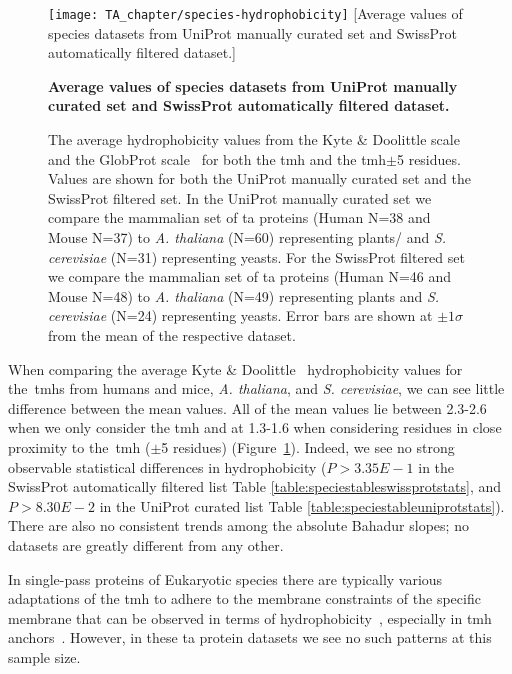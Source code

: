 \begin{figure}[!ht]
\centering
\texttt{[image: TA\_chapter/species-hydrophobicity]}
[Average values of species datasets from UniProt manually curated set and SwissProt automatically filtered dataset.]
{\textbf{Average values of species datasets from UniProt manually curated set and SwissProt automatically filtered dataset.}

The average hydrophobicity values from the Kyte \& Doolittle scale~\cite{Kyte1982} and the GlobProt scale~\cite{Linding2003} for both the \gls{tmh} and the \gls{tmh}$\pm$5 residues. Values are shown for both the UniProt manually curated set and the SwissProt filtered set. In the UniProt manually curated set we compare the mammalian set of \gls{ta} proteins (Human N=38 and Mouse N=37) to \textit{A. thaliana} (N=60) representing plants/ and \textit{S. cerevisiae} (N=31) representing yeasts. For the SwissProt filtered set we compare the mammalian set of \gls{ta} proteins (Human N=46 and Mouse N=48) to \textit{A. thaliana} (N=49) representing plants  and  \textit{S. cerevisiae} (N=24) representing yeasts.
Error bars are shown at $\pm 1 \sigma$ from the mean of the respective dataset.
}

\label{fig:average_species_hydrophobicity_ta}
\end{figure}

When comparing the average Kyte \& Doolittle~\cite{Kyte1982} hydrophobicity values for the~\gls{tmh}s from humans and mice, \textit{A. thaliana}, and  \textit{S. cerevisiae}, we can see little difference between the mean values.
All of the mean values lie between 2.3-2.6 when we only consider the \gls{tmh} and at 1.3-1.6 when considering residues in close proximity to the~\gls{tmh} ($\pm$5 residues) (Figure~\ref{fig:average_species_hydrophobicity_ta}).
Indeed, we see no strong observable statistical differences in hydrophobicity ($P>3.35E-1$ in the SwissProt automatically filtered list Table \ref{table:speciestableswissprotstats}, and $P>8.30E-2$ in the UniProt curated list Table \ref{table:speciestableuniprotstats}).
There are also no consistent trends among the absolute Bahadur slopes; no datasets are greatly different from any other.

In single-pass proteins of Eukaryotic species there are typically various adaptations of the \gls{tmh} to adhere to the membrane constraints of the specific membrane that can be observed in terms of hydrophobicity~\cite{Sharpe2010}, especially in \gls{tmh} anchors~\cite{Baker2017}.
However, in these \gls{ta} protein datasets we see no such patterns at this sample size.

